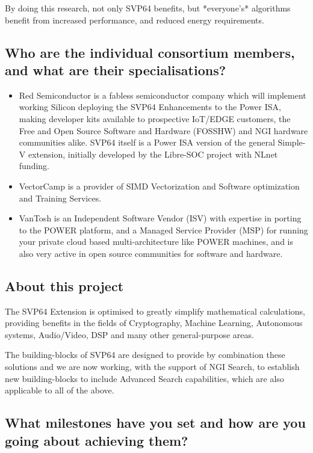 By doing this research, not only SVP64 benefits, but *everyone's* algorithms
benefit from increased performance, and reduced energy requirements.

\subsection{Who are the individual consortium members, and what are their specialisations?}

\begin{itemize}
  \item Red Semiconductor is a fabless semiconductor company which will implement
  working Silicon deploying the SVP64 Enhancements to the Power ISA, making
  developer kits available to prospective IoT/EDGE customers, the Free and
  Open Source Software and Hardware (FOSSHW) and NGI hardware communities
  alike. SVP64 itself is a Power ISA version of the general Simple-V
  extension, initially developed by the Libre-SOC project with NLnet funding.
  \item VectorCamp is a provider of SIMD Vectorization and Software optimization
  and Training Services.
  \item VanTosh is an Independent Software Vendor (ISV) with expertise in porting
  to the POWER platform, and a Managed Service Provider (MSP) for running
  your private cloud based multi-architecture like POWER machines, and is
  also very active in open source communities for software and hardware.
\end{itemize}

\subsection{About this project}

The SVP64 Extension is optimised to greatly simplify mathematical calculations,
providing benefits in the fields of Cryptography, Machine Learning,
Autonomous systems, Audio/Video, DSP and many other general-purpose areas.
 
The building-blocks of SVP64 are designed to provide by combination these
solutions and we are now working, with the support of NGI Search, to
establish new building-blocks to include Advanced Search capabilities,
which are also applicable to all of the above.

\subsection{What milestones have you set and how are you going about achieving them?}

